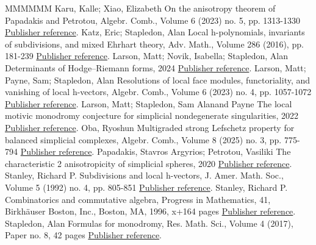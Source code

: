 \begin{thebibliography}{MMMMMM}
 Karu, Kalle; Xiao, Elizabeth On the anisotropy theorem of Papadakis and Petrotou, Algebr. Comb., Volume 6 (2023) no. 5, pp. 1313-1330 \href{https://alco.centre-mersenne.org/articles/10.5802/alco.453/#KaruXiao}{Publisher reference}.
 Katz, Eric; Stapledon, Alan Local h-polynomials, invariants of subdivisions, and mixed Ehrhart theory, Adv. Math., Volume 286 (2016), pp. 181-239 \href{https://alco.centre-mersenne.org/articles/10.5802/alco.453/#KatzStapledon16}{Publisher reference}.
 Larson, Matt; Novik, Isabella; Stapledon, Alan Determinants of Hodge–Riemann forms, 2024 \href{https://alco.centre-mersenne.org/articles/10.5802/alco.453/#LNS}{Publisher reference}.
 Larson, Matt; Payne, Sam; Stapledon, Alan Resolutions of local face modules, functoriality, and vanishing of local h-vectors, Algebr. Comb., Volume 6 (2023) no. 4, pp. 1057-1072 \href{https://alco.centre-mersenne.org/articles/10.5802/alco.453/#LPS1}{Publisher reference}.
 Larson, Matt; Stapledon, Sam Alanand Payne The local motivic monodromy conjecture for simplicial nondegenerate singularities, 2022 \href{https://alco.centre-mersenne.org/articles/10.5802/alco.453/#LPS2}{Publisher reference}.
 Oba, Ryoshun Multigraded strong Lefschetz property for balanced simplicial complexes, Algebr. Comb., Volume 8 (2025) no. 3, pp. 775-794 \href{https://alco.centre-mersenne.org/articles/10.5802/alco.453/#Oba}{Publisher reference}.
 Papadakis, Stavros Argyrios; Petrotou, Vasiliki The characteristic 2 anisotropicity of simplicial spheres, 2020 \href{https://alco.centre-mersenne.org/articles/10.5802/alco.453/#PapadakisPetrotoug}{Publisher reference}.
 Stanley, Richard P. Subdivisions and local h-vectors, J. Amer. Math. Soc., Volume 5 (1992) no. 4, pp. 805-851 \href{https://alco.centre-mersenne.org/articles/10.5802/alco.453/#Stanleylocalh}{Publisher reference}.
 Stanley, Richard P. Combinatorics and commutative algebra, Progress in Mathematics, 41, Birkhäuser Boston, Inc., Boston, MA, 1996, x+164 pages \href{https://alco.centre-mersenne.org/articles/10.5802/alco.453/#Stanleybook}{Publisher reference}.
 Stapledon, Alan Formulas for monodromy, Res. Math. Sci., Volume 4 (2017), Paper no. 8, 42 pages \href{https://alco.centre-mersenne.org/articles/10.5802/alco.453/#Stapledon17}{Publisher reference}.
\end{thebibliography}
